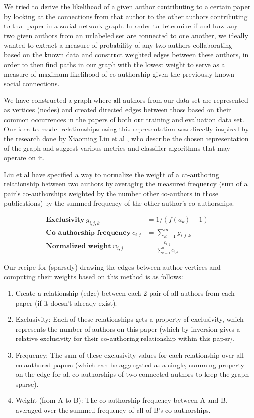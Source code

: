 
We tried to derive the likelihood of a given author contributing to a certain paper by looking at the connections from that author to the other authors contributing to that paper in a social network graph.
In order to determine if and how any two given authors from an unlabeled set are connected to one another, we ideally wanted to extract a measure of probability of any two authors collaborating based on the known data and construct weighted edges between these authors, in order to then find paths in our graph with the lowest weight to serve as a measure of maximum likelihood of co-authorship given the previously known social connections.

We have constructed a graph where all authors from our data set are represented as vertices (nodes) and created directed edges between those based on their common occurrences in the papers of both our training and evaluation data set.
Our idea to model relationships using this representation was directly inspired by the research done by Xiaoming Liu et al \cite{liu2005co}, who describe the chosen representation of the graph and suggest various metrics and classifier algorithms that may operate on it.

Liu et al have specified a way to normalize the weight of a co-authoring relationship between two authors by averaging the measured frequency (sum of a pair's co-authorships weighted by the number other co-authors in those publications) by the summed frequency of the other author's co-authorships.

\begin{align*}
\textbf{Exclusivity}~
	g_{i,j,k} &= 1 / (f(a_k)-1) \\
\textbf{Co-authorship frequency}~
	c_{i,j} &= \sum_{k=1}^{m} g_{i,j,k} \\
\textbf{Normalized weight}~
	w_{i,j} &= \frac{c_{i,j}}{\sum_{k=1}^{n} c_{i,k}}
\end{align*}

Our recipe for (sparsely) drawing the edges between author vertices and computing their weights based on this method is as follows:


\begin{enumerate}
  \item Create a relationship (edge) between each 2-pair of all authors from each paper (if it doesn't already exist).
  \item Exclusivity: Each of these relationships gets a property of exclusivity, which represents the number of authors on this paper (which by inversion gives a relative exclusivity for their co-authoring relationship within this paper).
  \item Frequency: The sum of these exclusivity values for each relationship over all co-authored papers (which can be aggregated as a single, summing property on the edge for all co-authorships of two connected authors to keep the graph sparse).
  \item Weight (from A to B): The co-authorship frequency between A and B, averaged over the summed frequency of all of B's co-authorships.
\end{enumerate}

